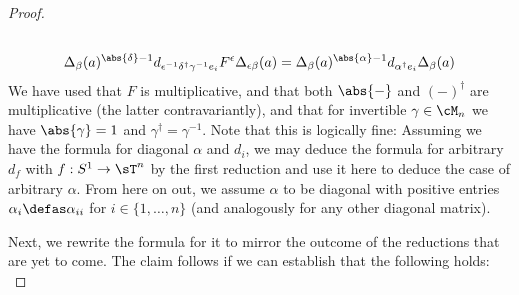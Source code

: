 \begin{proof}
\begin{gather}
	\\%
	\Delta_{\beta}(a)^{\abs{\delta}-1} d_{\epsilon^{-1} \delta^\dagger \gamma^{-1} e_i}%
		F^{\epsilon}\Delta_{\epsilon\beta}(a) = %
	\Delta_{\beta}(a)^{\abs{\alpha}-1} d_{\alpha^\dagger e_i} \Delta_{\beta}(a)%
\end{gather}
We have used that $F$ is multiplicative, and that both $\abs{-}$ and $(-)^\dagger$ are multiplicative (the latter contravariantly), and that for invertible $\gamma \in \cM_n$ we have $\abs{\gamma} = 1$ and $\gamma^\dagger = \gamma^{-1}$. Note that this is logically fine: Assuming we have the formula for diagonal $\alpha$ and $d_i$, we may deduce the formula for arbitrary $d_f$ with $f: S^1 \to \sT^n$ by the first reduction and use it here to deduce the case of arbitrary $\alpha$. From here on out, we assume $\alpha$ to be diagonal with positive entries $\alpha_{i} \defas \alpha_{ii}$ for $i \in \{1,\ldots,n\}$ (and analogously for any other diagonal matrix).\\
\begin{comment}	%
\begin{gather*}
	F^{\beta}_{\alpha\beta} d_i \Delta_{\alpha \beta} (a) = %
	F^{\beta}_{\gamma\delta\epsilon\beta} d_i \Delta_{\gamma\delta\epsilon\beta} (a) = %
	F^{\beta}_{\epsilon\beta} F^{\epsilon\beta}_{\delta\epsilon\beta}%
		F^{\delta\epsilon\beta}_{\gamma\delta\epsilon\beta} d_{\gamma (\gamma^{-1} e_i)}%
		\Delta_{\gamma\delta\epsilon\beta} (a) = %
		\\%
	F^{\beta}_{\epsilon\beta} F^{\epsilon\beta}_{\delta\epsilon\beta}%
		 d_{\gamma^{-1} e_i} F^{\delta\epsilon\beta}_{\gamma\delta\epsilon\beta}%
		\Delta_{\gamma\delta\epsilon\beta} (a) = %
	F^{\beta}_{\epsilon\beta} F^{\epsilon\beta}_{\delta\epsilon\beta}%
		 d_{\gamma^{-1} e_i} F^{\delta\epsilon\beta}_{\gamma\delta\epsilon\beta}%
		\Delta_{\gamma\delta\epsilon\beta} (a) =%
		\\%
	F^{\beta}_{\epsilon\beta} F^{\epsilon\beta}_{\delta\epsilon\beta}%
		 d_{\gamma^{-1} e_i} \Delta_{\delta\epsilon\beta} (a) =
	F^{\beta}_{\epsilon\beta} ( \Delta_{\delta\epsilon\beta} (a)^{\abs{\delta}-1}%
		d_{\delta^\dagger \gamma^{-1} e_i} \Delta_{\epsilon\beta}(a) ) = %
\end{gather*}
\end{comment}
Next, we rewrite the formula for it to mirror the outcome of the reductions that are yet to come. The claim follows if we can establish that the following holds:
\begin{equation}\label{eq_Fdw_one_dim_for_diagram}

\end{equation}
\end{proof}
